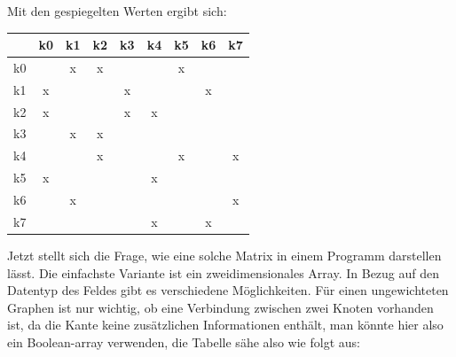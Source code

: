 \documentclass{article}
\begin{document}
Mit den gespiegelten Werten ergibt sich:
\begin{center}
    \begin{tabular}{|c|c|c|c|c|c|c|c|c|}
        \hline 
            & k0 & k1 & k2 & k3 & k4 & k5 & k6 & k7  \\
        \hline 
        k0 & & \color{red} x \color{black}& \color{red} x \color{black}& & & \color{red} x \color{black}& & \\
        \hline 
        k1 & \color{red} x \color{black} & & &\color{red} x \color{black} & & & \color{red} x \color{black}&\\
        \hline 
        k2 &  \color{red} x \color{black} & & & \color{red} x \color{black}& \color{red} x \color{black}& & &\\
        \hline 
        k3 & &\color{red} x \color{black}  & \color{red} x \color{black}  & & & & &\\
        \hline 
        k4 & & & \color{red} x \color{black} & & &\color{red} x \color{black} & & \color{red} x \color{black}\\
        \hline 
        k5 & \color{red} x \color{black} & & & & \color{red} x \color{black}  & & &\\
        \hline 
        k6 & & \color{red} x \color{black} & & & & & & \color{red} x \color{black}\\
        \hline 
        k7 & & & & &\color{red} x \color{black}  & & \color{red} x \color{black}  &\\
        \hline 
    \end{tabular} 
    \end{center}
Jetzt stellt sich die Frage, wie eine solche Matrix in einem Programm darstellen lässt. Die einfachste Variante ist ein zweidimensionales Array. In Bezug auf den Datentyp des Feldes gibt es verschiedene Möglichkeiten. Für einen ungewichteten Graphen ist nur wichtig, ob eine Verbindung zwischen zwei Knoten vorhanden ist, da die Kante keine zusätzlichen Informationen enthält, man könnte hier also ein Boolean-array verwenden, die Tabelle sähe also wie folgt aus:
\end{document}
